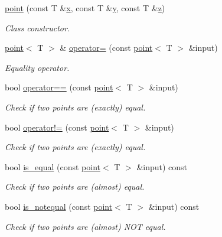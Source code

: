 \begin{DoxyCompactItemize}
\hyperlink{classddd_1_1point_a1f05ca364672341087e1a22b2298d649}{point} (const T \&\hyperlink{classddd_1_1point_af165c07ef348f3d795469b8b0918a3ba}{x}, const T \&\hyperlink{classddd_1_1point_a632f731dfcc4cc1693948d861cb7327d}{y}, const T \&\hyperlink{classddd_1_1point_aeb266a3811a70700ee7d52cacfdc0b9f}{z})
\begin{DoxyCompactList}\small\item\em Class constructor. \end{DoxyCompactList}\item 
\hyperlink{classddd_1_1point}{point}$<$ T $>$ \& \hyperlink{classddd_1_1point_ae767e47c1a939d5e6d24b3f810f43170}{operator=} (const \hyperlink{classddd_1_1point}{point}$<$ T $>$ \&input)
\begin{DoxyCompactList}\small\item\em Equality operator. \end{DoxyCompactList}\item 
bool \hyperlink{classddd_1_1point_a98f8e8097257f053b85e1ee32352fda4}{operator==} (const \hyperlink{classddd_1_1point}{point}$<$ T $>$ \&input)
\begin{DoxyCompactList}\small\item\em Check if two points are (exactly) equal. \end{DoxyCompactList}\item 
bool \hyperlink{classddd_1_1point_a2567b8c3cd08d965e70033f3f4a8d3db}{operator!=} (const \hyperlink{classddd_1_1point}{point}$<$ T $>$ \&input)
\begin{DoxyCompactList}\small\item\em Check if two points are (exactly) equal. \end{DoxyCompactList}\item 
bool \hyperlink{classddd_1_1point_aa4cdbbf16736ee09e840e33f77e94b8a}{is\+\_\+equal} (const \hyperlink{classddd_1_1point}{point}$<$ T $>$ \&input) const
\begin{DoxyCompactList}\small\item\em Check if two points are (almost) equal. \end{DoxyCompactList}\item 
bool \hyperlink{classddd_1_1point_a3d2415605fc07e3e0ed54ad68e2ade92}{is\+\_\+notequal} (const \hyperlink{classddd_1_1point}{point}$<$ T $>$ \&input) const
\begin{DoxyCompactList}\small\item\em Check if two points are (almost) N\+OT equal. \end{DoxyCompactList}\item 

\end{DoxyCompactItemize}
